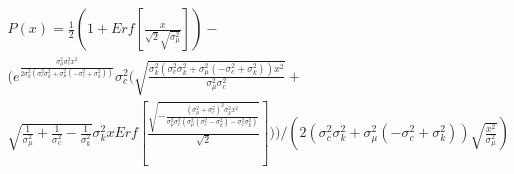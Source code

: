 \documentclass[letterpaper,10pt]{article}
\begin{document}
\begin{multline*}
P(x) = \frac{1}{2} \left(1+ {Erf}\left[\frac{x}{\sqrt{2} \sqrt{\sigma_{\mu}^2}}\right]\right)-\\
\Biggl(e^{\frac{\sigma_{\mu}^2  {\sigma_{c}^2} x^2}{2  {\sigma_{k}^2} ( {\sigma_{c}^2}  {\sigma_{k}^2}+\sigma_{\mu}^2 (- {\sigma_{c}^2}+ {\sigma_{k}^2}))}}  {\sigma_{c}^2} \Biggl(\sqrt{\frac{ {\sigma_{k}^2} ( {\sigma_{c}^2}  {\sigma_{k}^2}+\sigma_{\mu}^2 (- {\sigma_{c}^2}+ {\sigma_{k}^2})) x^2}{\sigma_{\mu}^2  {\sigma_{c}^2}}}+\\
\sqrt{\frac{1}{\sigma_{\mu}^2}+\frac{1}{ {\sigma_{c}^2}}-\frac{1}{ {\sigma_{k}^2}}}  {\sigma_{k}^2} x  {Erf}\left[\frac{\sqrt{-\frac{(\sigma_{\mu}^2+ {\sigma_{c}^2})^2  {\sigma_{k}^2} x^2}{\sigma_{\mu}^2  {\sigma_{c}^2} (\sigma_{\mu}^2 ( {\sigma_{c}^2}- {\sigma_{k}^2})- {\sigma_{c}^2}  {\sigma_{k}^2})}}}{\sqrt{2}}\right]\Biggr)\Biggr)/\left(2 ( {\sigma_{c}^2}  {\sigma_{k}^2}+\sigma_{\mu}^2 (- {\sigma_{c}^2}+ {\sigma_{k}^2})) \sqrt{\frac{x^2}{\sigma_{\mu}^2}}\right)
\end{multline*}
\end{document}
